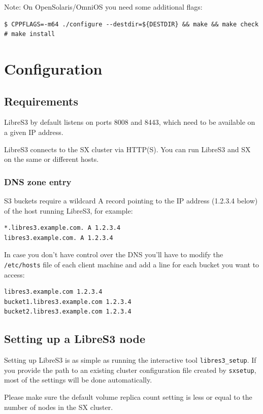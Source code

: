 Note: On OpenSolaris/OmniOS you need some additional flags:
\begin{lstlisting}
$ CPPFLAGS=-m64 ./configure --destdir=${DESTDIR} && make && make check
# make install
\end{lstlisting}
\chapter{Configuration}

\section{Requirements}

LibreS3 by default listens on ports 8008 and 8443, which need to be available on a given
IP address.

LibreS3 connects to the SX cluster via HTTP(S). You can run LibreS3 and SX
on the same or different hosts.

\subsection{DNS zone entry}

S3 buckets require a wildcard A record pointing to the IP address (1.2.3.4 below) of the
host running LibreS3, for example:

\begin{lstlisting}
*.libres3.example.com. A 1.2.3.4
libres3.example.com. A 1.2.3.4
\end{lstlisting}


In case you don't have control over the DNS you'll have to modify the \verb|/etc/hosts| file
of each client machine and add a line for each bucket you want to access:

\begin{lstlisting}
libres3.example.com 1.2.3.4
bucket1.libres3.example.com 1.2.3.4
bucket2.libres3.example.com 1.2.3.4
\end{lstlisting}


\section{Setting up a LibreS3 node}

Setting up LibreS3 is as simple as running the interactive tool \verb+libres3_setup+.
If you provide the path to an existing \SX cluster configuration file created
by \verb+sxsetup+, most of the settings will be done automatically.

Please make sure the default volume replica count setting is less or equal
to the number of nodes in the SX cluster.

